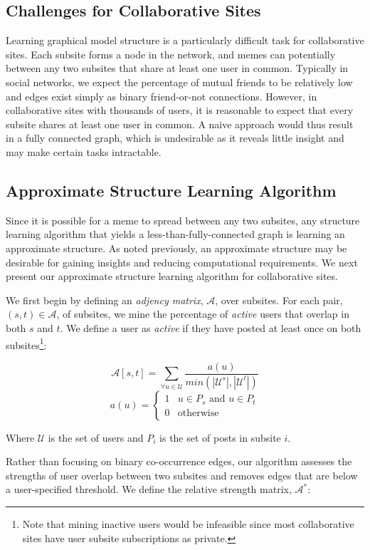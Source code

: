 \documentclass{article} %
\begin{document}
\subsection{Challenges for Collaborative Sites}
Learning graphical model structure is a particularly difficult task for collaborative sites. Each subsite forms a node in the network, and memes can potentially between any two subsites that share at least one user in common. Typically in social networks, we expect the percentage of mutual friends to be relatively low and edges exist simply as binary friend-or-not connections. However, in collaborative sites with thousands of users, it is reasonable to expect that every subsite shares at least one user in common. A naive approach would thus result in a fully connected graph, which is undesirable as it reveals little insight and may make certain tasks intractable.

\subsection{Approximate Structure Learning Algorithm}
Since it is possible for a meme to spread between any two subsites, any structure learning algorithm that yields a less-than-fully-connected graph is learning an approximate structure. As noted previously, an approximate structure may be desirable for gaining insights and reducing computational requirements. We next present our approximate structure learning algorithm for collaborative sites.

We first begin by defining an \textit{adjency matrix}, $\mathcal{A}$, over subsites. For each pair, $(s,t) \in \mathcal{A}$, of subsites, we mine the percentage of \textit{active} users that overlap in both $s$ and $t$. We define a user as \textit{active} if they have posted at least once on both subsites\footnote{Note that mining inactive users would be infeasible since most collaborative sites have user subsite subscriptions as private.}:

$$
\mathcal{A}[s,t] = \sum_{\forall u \in \mathcal{U}}\dfrac{a(u)}{min(|\mathcal{U}^s|,|\mathcal{U}^t|)}$$
$$
a(u) = \begin{cases}1&u \in P_s\text{ and }u \in P_t\\0 &\text{otherwise}\end{cases}
$$

Where $\mathcal{U}$ is the set of users and $P_i$ is the set of posts in subsite $i$.

Rather than focusing on binary co-occurrence edges, our algorithm assesses the strengths of user overlap between two subsites and removes edges that are below a user-specified threshold. We define the relative strength matrix, $\mathcal{A}^*$:
\end{document}
